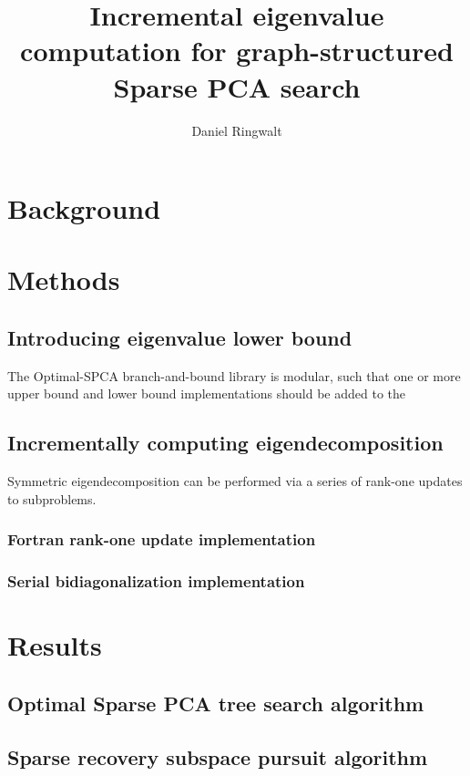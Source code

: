 \documentclass{article}
\title{Incremental eigenvalue computation for graph-structured Sparse PCA search}
\author{Daniel Ringwalt}
\begin{document}
	
\maketitle

\section{Background}

\section{Methods}

\subsection{Introducing eigenvalue lower bound}

The Optimal-SPCA branch-and-bound library is modular, such that one or more upper bound and lower bound implementations should be added to the 

\subsection{Incrementally computing eigendecomposition}

Symmetric eigendecomposition can be performed via a series of rank-one updates to subproblems.

\subsubsection{Fortran rank-one update implementation}

\subsubsection{Serial bidiagonalization implementation}



\section{Results}

\subsection{Optimal Sparse PCA tree search algorithm}

\subsection{Sparse recovery subspace pursuit algorithm}
\end{document}
